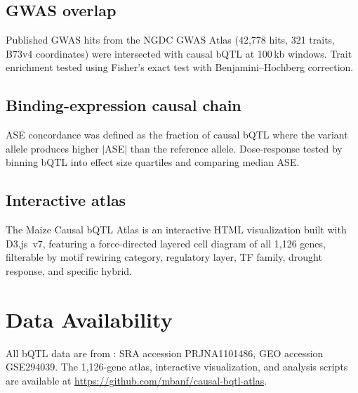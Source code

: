 \documentclass[11pt,a4paper]{article}
\begin{document}
\subsection{GWAS overlap}
Published GWAS hits from the NGDC GWAS Atlas (42,778 hits, 321 traits, B73v4
coordinates) were intersected with causal bQTL at 100\,kb windows. Trait
enrichment tested using Fisher's exact test with Benjamini--Hochberg
correction.

\subsection{Binding-expression causal chain}
ASE concordance was defined as the fraction of causal bQTL where the variant
allele produces higher $|$ASE$|$ than the reference allele. Dose-response
tested by binning bQTL into effect size quartiles and comparing median ASE.

\subsection{Interactive atlas}
The Maize Causal bQTL Atlas is an interactive HTML visualization built with
D3.js~v7, featuring a force-directed layered cell diagram of all 1,126 genes,
filterable by motif rewiring category, regulatory layer, TF family, drought
response, and specific hybrid.


\section{Data Availability}

All bQTL data are from \citet{engelhorn2025}: SRA accession PRJNA1101486,
GEO accession GSE294039. The 1,126-gene atlas, interactive visualization,
and analysis scripts are available at
\url{https://github.com/mbanf/causal-bqtl-atlas}.


\end{document}
